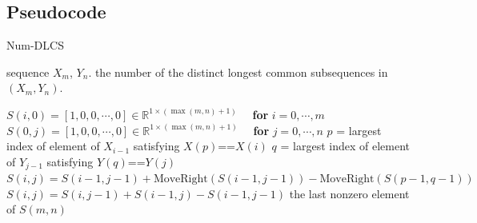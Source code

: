 \documentclass{article}
\newcommand{\Rset}{\mathbb{R}}
\begin{document}
\begin{spacing}{1.4}
\subsection{Pseudocode}
\begin{algorithm}[htb!] \label{Num-DLCS}
  \caption{Num-DLCS}
  \begin{algorithmic}[1] %

    \Require sequence $X_m$, $Y_n$.
    \Ensure the number of the distinct longest common subsequences in $(X_m, Y_n)$.

      \State $S(i,0) = [1, 0, 0, \cdots, 0] \in \Rset^{1 \times (\max(m,n)+1)}$ ~~\textbf{for} $i=0, \cdots, m$
      \State $S(0,j) = [1, 0, 0, \cdots, 0] \in \Rset^{1 \times (\max(m,n)+1)}$ ~~\textbf{for} $j=0, \cdots, n$
            \State $p$ = largest index of element of $X_{i-1}$ satisfying $X(p)$==$X(i)$
            \State $q$ = largest index of element of $Y_{j-1}$ satisfying $Y(q)$==$Y(j)$
            \State $S(i,j) = S(i-1,j-1) + \text{MoveRight}(S(i-1,j-1)) - \text{MoveRight}(S(p-1,q-1))$
          \Else
            \State $S(i,j) = S(i,j-1) + S(i-1,j) - S(i-1,j-1)$
          \EndIf
        \EndFor
      \EndFor
      \State \Return the last nonzero element of $S(m,n)$
    \EndFunction

  \end{algorithmic}
\end{algorithm}


\end{spacing}
\end{document}
